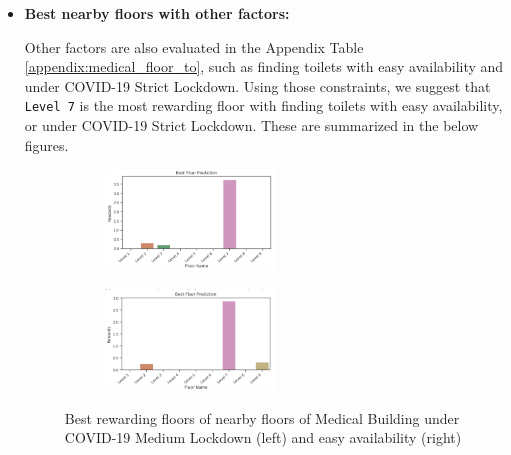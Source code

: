 \begin{itemize}
    
    
    \item \textbf{Best nearby floors with other factors:}
    
    Other factors are also evaluated in the Appendix Table \ref{appendix:medical_floor_to}, such as finding toilets with easy availability and under COVID-19 Strict Lockdown. Using those constraints, we suggest that \texttt{Level 7} is the most rewarding floor with finding toilets with easy availability, or under COVID-19 Strict Lockdown. These are summarized in the below figures.
    
    
\begin{figure}[H]
\centering
\begin{subfigure}[b]{0.30\textwidth}
  \centering
  \includegraphics[width=4.5cm,keepaspectratio=true]{resources/images/floor_to/medical_covidmedium.png}
\end{subfigure}
\begin{subfigure}[b]{0.30\textwidth}
  \centering
  \includegraphics[width=4.5cm,keepaspectratio=true]{resources/images/floor_to/medical_easyava.png}
\end{subfigure}
\caption{Best rewarding floors of nearby floors of Medical Building under COVID-19 Medium Lockdown (left) and easy availability (right)}
\label{fig:medical-other-factors}
\end{figure}
\end{itemize}

